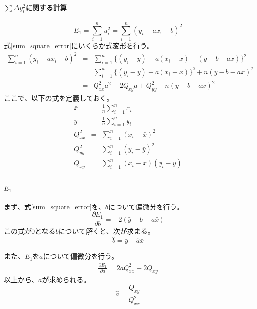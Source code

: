 \paragraph{$\sum \Delta y_i^2$に関する計算}
\begin{equation}\label{sum_square_error}
 E_1 = \sum_{i=1}^n u_i^2 = \sum_{i=1}^n (y_i-a x_i-b)^2
\end{equation}
式\ref{sum_square_error}にいくらか式変形を行う。
\begin{eqnarray*}
 \sum_{i=1}^n (y_i-a x_i-b)^2 &=& \sum_{i=1}^n \{(y_i-\bar{y}) - a(x_i-\bar{x}) +(\bar{y}-b-a\bar{x})  \}^2\\
 & =& \sum_{i=1}^n \{ (y_i-\bar{y})-a(x_i-\bar{x})  \}^2+n(\bar{y}-b-a\bar{x})^2 \\
 &=& Q^2_{xx}a^2-2Q_{xy}a+Q^2_{yy}+n(\bar{y}-b-a\bar{x})^2
\end{eqnarray*}
ここで、以下の式を定義しておく。
\begin{eqnarray*}
 \bar{x} &=& \frac{1}{n}\sum_{i=1}^n x_i \\
 \bar{y}&=& \frac{1}{n}\sum_{i=1}^n y_i \\
 Q^2_{xx} &=& \sum_{i=1}^n (x_i-\bar{x})^2 \\
 Q^2_{yy} &=& \sum_{i=1}^n (y_i-\bar{y})^2 \\
 Q_{xy} &=& \sum_{i=1}^n (x_i-\bar{x})(y_i-\bar{y}) \\
\end{eqnarray*}

\paragraph{$E_1$}
まず、式\ref{sum_square_error}を、$b$について偏微分を行う。
\begin{equation*}
 \frac{\partial E_1}{\partial b} = -2(\bar{y}-b-a\bar{x})
\end{equation*}
この式が$0$となる$b$について解くと、次が求まる。
\begin{equation*}
 \hat{b} = \bar{y}-\hat{a}\bar{x}
\end{equation*}

また、$E_1$を$a$について偏微分を行う。
\begin{eqnarray*}
 \frac{\partial E_1}{\partial a} = 2aQ^2_{xx}-2Q_{xy}
\end{eqnarray*}
以上から、$a$が求められる。
\begin{equation*}
 \hat{a} = \frac{Q_{xy}}{Q^2_{xx}}
\end{equation*}


